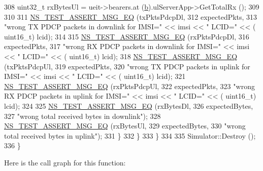 \begin{DoxyCode}
308               uint32\_t rxBytesUl = ueit->bearers.at (\hyperlink{buildings__pathloss_8m_a21ad0bd836b90d08f4cf640b4c298e7c}{b}).ulServerApp->GetTotalRx ();
309               
310               
311               \hyperlink{group__testing_ga2a9d78cffb3db8e867c35fff0b698cf5}{NS\_TEST\_ASSERT\_MSG\_EQ} (txPktsPdcpDl, 
312                                      expectedPkts, 
313                                      \textcolor{stringliteral}{"wrong TX PDCP packets in downlink for IMSI="} << imsi << \textcolor{stringliteral}{" LCID="} << (
      uint16\_t) lcid);
314               
315               \hyperlink{group__testing_ga2a9d78cffb3db8e867c35fff0b698cf5}{NS\_TEST\_ASSERT\_MSG\_EQ} (rxPktsPdcpDl, 
316                                      expectedPkts, 
317                                      \textcolor{stringliteral}{"wrong RX PDCP packets in downlink for IMSI="} << imsi << \textcolor{stringliteral}{" LCID="} << (
      uint16\_t) lcid);
318               \hyperlink{group__testing_ga2a9d78cffb3db8e867c35fff0b698cf5}{NS\_TEST\_ASSERT\_MSG\_EQ} (txPktsPdcpUl, 
319                                      expectedPkts, 
320                                      \textcolor{stringliteral}{"wrong TX PDCP packets in uplink for IMSI="} << imsi << \textcolor{stringliteral}{" LCID="} << (
      uint16\_t) lcid);
321               \hyperlink{group__testing_ga2a9d78cffb3db8e867c35fff0b698cf5}{NS\_TEST\_ASSERT\_MSG\_EQ} (rxPktsPdcpUl, 
322                                      expectedPkts, 
323                                      \textcolor{stringliteral}{"wrong RX PDCP packets in uplink for IMSI="} << imsi << \textcolor{stringliteral}{" LCID="} << (
      uint16\_t) lcid);        
324 
325               \hyperlink{group__testing_ga2a9d78cffb3db8e867c35fff0b698cf5}{NS\_TEST\_ASSERT\_MSG\_EQ} (rxBytesDl, 
326                                      expectedBytes, 
327                                      \textcolor{stringliteral}{"wrong total received bytes in downlink"});
328               \hyperlink{group__testing_ga2a9d78cffb3db8e867c35fff0b698cf5}{NS\_TEST\_ASSERT\_MSG\_EQ} (rxBytesUl, 
329                                      expectedBytes, 
330                                      \textcolor{stringliteral}{"wrong total received bytes in uplink"});
331             \}
332         \}      
333     \}
334   
335   Simulator::Destroy ();
336 \}
\end{DoxyCode}


Here is the call graph for this function\+:




